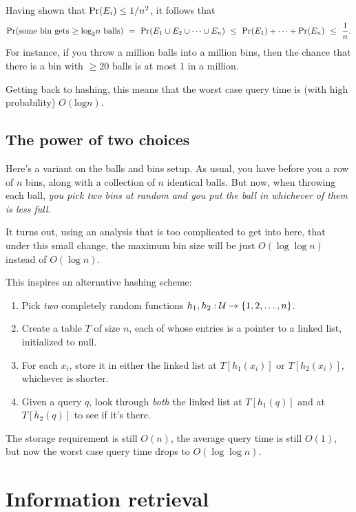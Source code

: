 \documentclass{report}
\theoremstyle{plain}
\theoremstyle{definition}
\newcommand{\pr}{\mbox{\rm Pr}}
\def\U{{\cal U}}
\begin{document}
Having shown that $\pr(E_i) \leq 1/n^2$, it follows that
$$ \pr(\mbox{some bin gets $\geq \log n$ balls})
\ = \ 
\pr(E_1 \cup E_2 \cup \cdots \cup E_n)
\ \leq \ 
\pr(E_1) + \cdots + \pr(E_n) 
\ \leq \ 
\frac{1}{n}.
$$
For instance, if you throw a million balls into a million bins, then the chance that
there is a bin with $\geq 20$ balls is at most 1 in a million.

Getting back to hashing, this means that the worst case query time is (with high
probability) $O(\mbox{log} n)$.

\subsection{The power of two choices}

Here's a variant on the balls and bins setup. As usual, you have before you a 
row of $n$ bins, along with a collection of $n$ identical balls. But now, 
when throwing each ball, {\it you pick two bins at random and you put the
ball in whichever of them is less full}.

It turns out, using an analysis that is too complicated to get into here, that
under this small change, the maximum bin size will be just $O(\log \log n)$ 
instead of $O(\log n)$.

This inspires an alternative hashing scheme:

\begin{enumerate}
\item Pick {\it two} completely random functions $h_1, h_2: \U \rightarrow \{1,2,\ldots, n\}$. 

\item Create a table $T$ of size $n$, each of whose entries is a pointer to a 
linked list, initialized to null. 

\item For each $x_i$, store it in either the linked list at $T[h_1(x_i)]$ or $T[h_2(x_i)]$,
whichever is shorter.

\item Given a query $q$, look through {\it both} the linked list at $T[h_1(q)]$ and
at $T[h_2(q)]$ to see if it's there.
\end{enumerate}

The storage requirement is still $O(n)$, the average query time is still $O(1)$, but now
the worst case query time drops to $O(\log \log n)$.

\section{Information retrieval}
\end{document}
